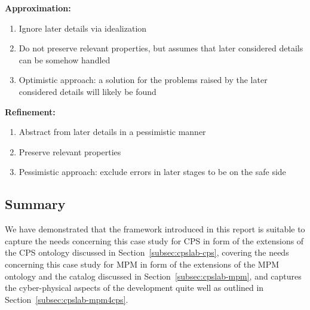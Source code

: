 {{\bf Approximation:}

\begin{enumerate}
    \item Ignore later details via idealization
\item Do not preserve relevant properties, but assumes that later considered details can be somehow handled
\item Optimistic approach: a solution for the problems raised by the later considered details will likely be found
    
\end{enumerate}

{\bf Refinement:}

\begin{enumerate}
    \item Abstract from later details in a pessimistic manner
\item Preserve relevant properties
\item Pessimistic approach: 
exclude errors in later stages to be on the safe side
\end{enumerate}


}

%

\subsection{Summary}
%
We have demonstrated that the framework introduced in this report is 
%
suitable to capture the needs concerning this case study for CPS in form of the extensions of the CPS ontology discussed in  Section~\ref{subsec:cpslab-cps},
%
covering the needs concerning this case study for MPM in form of the extensions of the MPM ontology and the catalog discussed in  Section~\ref{subsec:cpslab-mpm}, and
%
captures the cyber-physical aspects of the development quite well as outlined in  Section~\ref{subsec:cpslab-mpm4cps}.

